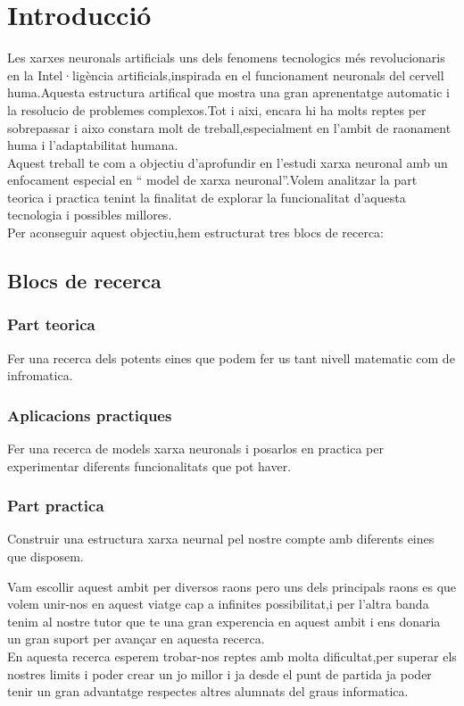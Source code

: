 \chapter{Introducció}
\label{c:intro}
Les xarxes neuronals artificials uns dels fenomens tecnologics més revolucionaris en la Intel·ligència artificials,inspirada en el funcionament neuronals del cervell huma.Aquesta estructura artifical que mostra una gran aprenentatge automatic i la resolucio de problemes complexos.Tot i aixi, encara hi ha molts reptes per sobrepassar i aixo constara molt de treball,especialment en l'ambit de raonament huma i l'adaptabilitat humana.\\
Aquest treball te com a objectiu d'aprofundir en l'estudi xarxa neuronal amb un enfocament especial en `` model de xarxa neuronal''.Volem analitzar la part teorica i practica tenint la finalitat de explorar la funcionalitat d'aquesta tecnologia i possibles millores.\\
Per aconseguir aquest objectiu,hem estructurat tres blocs de recerca:
\section{Blocs de recerca}
\subsection{Part teorica}
Fer una recerca dels potents eines que podem fer us tant nivell matematic com de infromatica.
\subsection{Aplicacions practiques}
Fer una recerca de models xarxa neuronals i posarlos en practica per experimentar diferents funcionalitats que pot haver.
\subsection{Part practica }
Construir una estructura xarxa neurnal pel nostre compte amb diferents eines que disposem.

Vam escollir aquest ambit per diversos raons pero uns dels principals raons es que volem unir-nos en aquest viatge cap  a infinites possibilitat,i per l'altra banda tenim al nostre tutor que te una gran experencia en aquest ambit i ens donaria un gran suport per avançar en aquesta recerca.\\
En aquesta recerca esperem trobar-nos reptes amb molta dificultat,per superar els nostres limits i poder crear un jo millor i ja desde el punt de partida ja poder tenir un gran advantatge respectes altres alumnats del graus informatica.

















